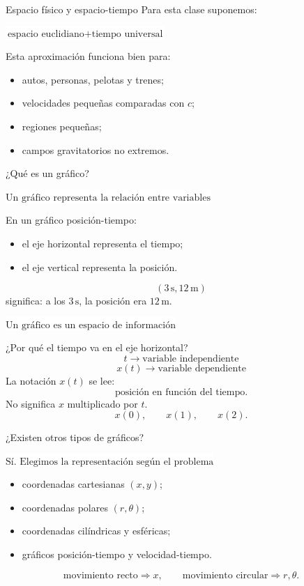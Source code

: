 \documentclass[aspectratio=169,11pt]{beamer}
\newcommand{\caja}[1]{%
  \begin{center}
  \setlength{\fboxsep}{9pt}
  \colorbox{white}{\(\displaystyle \boxed{#1}\)}
  \end{center}
}
\begin{document}
\begin{frame}{Espacio físico y espacio-tiempo}
  Para esta clase suponemos:
  \caja{\text{espacio euclidiano}+\text{tiempo universal}}
  \vspace{0.5em}
  Esta aproximación funciona bien para:
  \begin{itemize}
    \item autos, personas, pelotas y trenes;
    \item velocidades pequeñas comparadas con \(c\);
    \item regiones pequeñas;
    \item campos gravitatorios no extremos.
  \end{itemize}
\end{frame}

\begin{frame}{¿Qué es un gráfico?}
  \caja{\text{Un gráfico representa la relación entre variables}}
  \vspace{0.5em}
  En un gráfico posición-tiempo:
  \begin{itemize}
    \item el eje horizontal representa el tiempo;
    \item el eje vertical representa la posición.
  \end{itemize}
  \[
    (3\,\mathrm{s},12\,\mathrm{m})
  \]
  significa: a los \(3\,\mathrm{s}\), la posición era \(12\,\mathrm{m}\).
  \caja{\text{Un gráfico es un espacio de información}}
\end{frame}

\begin{frame}{¿Por qué el tiempo va en el eje horizontal?}
  \[
    t\longrightarrow \text{variable independiente}
  \]
  \[
    x(t)\longrightarrow \text{variable dependiente}
  \]
  \vspace{0.4em}
  La notación \(x(t)\) se lee:
  \[
    \text{posición en función del tiempo}.
  \]
  No significa \(x\) multiplicado por \(t\).
  \[
    x(0),\qquad x(1),\qquad x(2).
  \]
\end{frame}

\begin{frame}{¿Existen otros tipos de gráficos?}
  \caja{\text{Sí. Elegimos la representación según el problema}}
  \begin{itemize}
    \item coordenadas cartesianas \((x,y)\);
    \item coordenadas polares \((r,\theta)\);
    \item coordenadas cilíndricas y esféricas;
    \item gráficos posición-tiempo y velocidad-tiempo.
  \end{itemize}
  \[
    \text{movimiento recto}\Rightarrow x,
    \qquad
    \text{movimiento circular}\Rightarrow r,\theta.
  \]
\end{frame}
\end{document}
